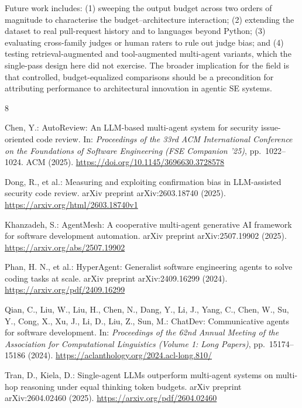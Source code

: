 \documentclass[pdflatex,sn-mathphys-num]{sn-jnl}
\theoremstyle{thmstyleone}
\theoremstyle{thmstyletwo}
\theoremstyle{thmstylethree}
\begin{document}
Future work includes: (1) sweeping the output budget across two orders of magnitude to characterise the budget--architecture interaction; (2) extending the dataset to real pull-request history and to languages beyond Python; (3) evaluating cross-family judges or human raters to rule out judge bias; and (4) testing retrieval-augmented and tool-augmented multi-agent variants, which the single-pass design here did not exercise. The broader implication for the field is that controlled, budget-equalized comparisons should be a precondition for attributing performance to architectural innovation in agentic SE systems.

\begin{thebibliography}{8}

Chen, Y.: AutoReview: An LLM-based multi-agent system for security issue-oriented code review. In: \textit{Proceedings of the 33rd ACM International Conference on the Foundations of Software Engineering (FSE Companion '25)}, pp.\ 1022--1024. ACM (2025). \url{https://doi.org/10.1145/3696630.3728578}

Dong, R., et al.: Measuring and exploiting confirmation bias in LLM-assisted security code review. arXiv preprint arXiv:2603.18740 (2025). \url{https://arxiv.org/html/2603.18740v1}

Khanzadeh, S.: AgentMesh: A cooperative multi-agent generative AI framework for software development automation. arXiv preprint arXiv:2507.19902 (2025). \url{https://arxiv.org/abs/2507.19902}

Phan, H. N., et al.: HyperAgent: Generalist software engineering agents to solve coding tasks at scale. arXiv preprint arXiv:2409.16299 (2024). \url{https://arxiv.org/pdf/2409.16299}

Qian, C., Liu, W., Liu, H., Chen, N., Dang, Y., Li, J., Yang, C., Chen, W., Su, Y., Cong, X., Xu, J., Li, D., Liu, Z., Sun, M.: ChatDev: Communicative agents for software development. In: \textit{Proceedings of the 62nd Annual Meeting of the Association for Computational Linguistics (Volume 1: Long Papers)}, pp.\ 15174--15186 (2024). \url{https://aclanthology.org/2024.acl-long.810/}

Tran, D., Kiela, D.: Single-agent LLMs outperform multi-agent systems on multi-hop reasoning under equal thinking token budgets. arXiv preprint arXiv:2604.02460 (2025). \url{https://arxiv.org/pdf/2604.02460}


\end{thebibliography}
\end{document}
